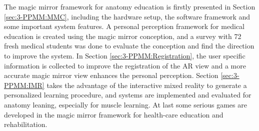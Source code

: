 The magic mirror framework for anatomy education is firstly presented in Section \ref{sec:3-PPMM:MMC}, including the hardware setup, the software framework and some important system features. A personal perception framework for medical education is created using the magic mirror conception, and a survey with 72 fresh medical students was done to evaluate the conception and find the direction to improve the system. In Section \ref{sec:3-PPMM:Registration}, the user specific information is collected to improve the registration of the AR view and a more accurate magic mirror view enhances the personal perception. Section \ref{sec:3-PPMM:IMR} takes the advantage of the interactive mixed reality to generate a personalized learning procedure, and systems are implemented and evaluated for anatomy leaning, especially for muscle learning. At last some serious games are developed in the magic mirror framework for health-care education and rehabilitation.



